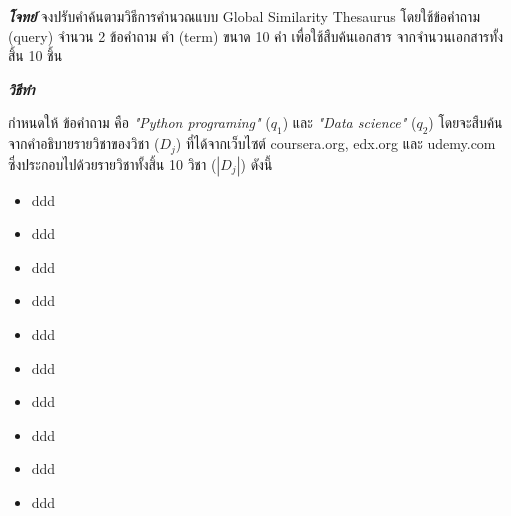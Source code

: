 \documentclass[11pt,a4paper]{report}
\begin{document}
    \emph{\bf{โจทย์}}
        จงปรับคำค้นตามวิธีการคำนวณแบบ Global Similarity Thesaurus โดยใช้ข้อคำถาม (query) จำนวน 2 ข้อคำถาม คำ (term) ขนาด 10 คำ เพื่อใช้สืบค้นเอกสาร จากจำนวนเอกสารทั้งสิ้น 10 ชิ้น 

    \emph{\bf{วิธีทำ}}  

    กำหนดให้ ข้อคำถาม คือ \emph{"Python programing"} ($q_1$) และ \emph{"Data science"} ($q_2$) โดยจะสืบค้นจากคำอธิบายรายวิชาของวิชา ($D_j$) ที่ได้จากเว็บไซต์ coursera.org, edx.org และ udemy.com ซึ่งประกอบไปด้วยรายวิชาทั้งสิ้น 10 วิชา ($|D_j|$) ดังนี้
    \begin{itemize}
        \item ddd
        \item ddd
        \item ddd
        \item ddd
        \item ddd
        \item ddd
        \item ddd
        \item ddd
        \item ddd
        \item ddd
    \end{itemize}
        
\end{document}
